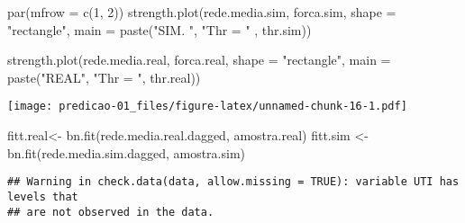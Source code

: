 \documentclass[
]{article}
\newenvironment{Shaded}{\begin{snugshade}}{\end{snugshade}}
\newcommand{\AttributeTok}[1]{\textcolor[rgb]{0.77,0.63,0.00}{#1}}
\newcommand{\DecValTok}[1]{\textcolor[rgb]{0.00,0.00,0.81}{#1}}
\newcommand{\FunctionTok}[1]{\textcolor[rgb]{0.00,0.00,0.00}{#1}}
\newcommand{\NormalTok}[1]{#1}
\newcommand{\OtherTok}[1]{\textcolor[rgb]{0.56,0.35,0.01}{#1}}
\newcommand{\StringTok}[1]{\textcolor[rgb]{0.31,0.60,0.02}{#1}}
\begin{document}
\begin{Shaded}
\begin{Highlighting}[]
\FunctionTok{par}\NormalTok{(}\AttributeTok{mfrow =} \FunctionTok{c}\NormalTok{(}\DecValTok{1}\NormalTok{, }\DecValTok{2}\NormalTok{))}
\FunctionTok{strength.plot}\NormalTok{(rede.media.sim, }
\NormalTok{              forca.sim, }
              \AttributeTok{shape =} \StringTok{"rectangle"}\NormalTok{, }
              \AttributeTok{main =} \FunctionTok{paste}\NormalTok{(}\StringTok{"SIM. "}\NormalTok{, }\StringTok{"Thr = "}\NormalTok{ , thr.sim))}

\FunctionTok{strength.plot}\NormalTok{(rede.media.real, }
\NormalTok{              forca.real, }
              \AttributeTok{shape =} \StringTok{"rectangle"}\NormalTok{, }
              \AttributeTok{main =} \FunctionTok{paste}\NormalTok{(}\StringTok{"REAL"}\NormalTok{, }\StringTok{"Thr = "}\NormalTok{, thr.real))}
\end{Highlighting}
\end{Shaded}

\texttt{[image: predicao-01\_files/figure-latex/unnamed-chunk-16-1.pdf]}

\begin{Shaded}
\begin{Highlighting}[]
\NormalTok{fitt.real}\OtherTok{\textless{}{-}} \FunctionTok{bn.fit}\NormalTok{(rede.media.real.dagged, amostra.real)}
\NormalTok{fitt.sim }\OtherTok{\textless{}{-}} \FunctionTok{bn.fit}\NormalTok{(rede.media.sim.dagged, amostra.sim)}
\end{Highlighting}
\end{Shaded}

\begin{verbatim}
## Warning in check.data(data, allow.missing = TRUE): variable UTI has levels that
## are not observed in the data.
\end{verbatim}
\end{document}
